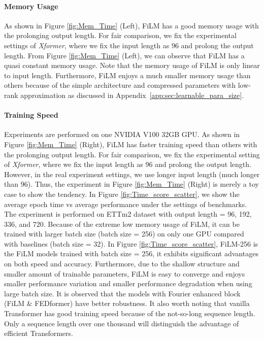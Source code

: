 \documentclass{article}
\begin{document}
\paragraph{Memory Usage}
As shown in Figure \ref{fig:Mem_Time} (Left), FiLM has a good memory usage with the prolonging output length. For fair comparison, we fix the experimental settings of \textit{Xformer}, where we fix the input length as 96 and prolong the output length. From Figure \ref{fig:Mem_Time} (Left), we can observe that FiLM has a quasi constant memory usage. Note that the memory usage of FiLM is only linear to input length. Furthermore, FiLM enjoys a much smaller memory usage than others because of the simple architecture and compressed parameters with low-rank approximation as discussed in Appendix~\ref{app:sec:learnable_para_size}.

\paragraph{Training Speed}
Experiments are performed on one NVIDIA V100 32GB GPU. As shown in Figure \ref{fig:Mem_Time} (Right), FiLM has faster training speed than others with the prolonging output length. For fair comparison, we fix the experimental setting of \textit{Xformer}, where we fix the input length as 96 and prolong the output length. However, in the real experiment settings, we use longer input length (much longer than 96). Thus, the experiment in Figure \ref{fig:Mem_Time} (Right) is merely a toy case to show the tendency. In Figure \ref{fig:Time_score_scatter}, we show the average epoch time vs average performance under the settings of benchmarks. The experiment is performed on ETTm2 dataset with output length = 96, 192, 336, and 720. Because of the extreme low memory usage of FiLM, it can be trained with larger batch size (batch size = 256) on only one GPU compared with baselines (batch size = 32). In Figure \ref{fig:Time_score_scatter}, FiLM-256 is the FiLM models trained with batch size = 256, it exhibits significant advantages on both speed and accuracy. Furthermore, due to the shallow structure and smaller amount of trainable parameters, FiLM is easy to converge and enjoys smaller performance variation and smaller performance degradation when using large batch size. It is observed that the models with Fourier enhanced block (FiLM \& FEDformer) have better robustness. It also worth noting that vanilla Transformer has good training speed because of the not-so-long sequence length. Only a sequence length over one thousand will distinguish the advantage of efficient Transformers.
\end{document}
